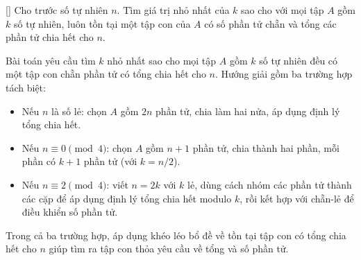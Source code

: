 \documentclass[../09-contruction-methods.tex]{subfiles}
\begin{document}
\begin{example*}\label{example:IRN-2015-TST-D2-P1}[\textbf{}]
	Cho trước số tự nhiên \( n \). Tìm giá trị nhỏ nhất của \( k \) sao cho với mọi tập \( A \) gồm \( k \) số tự nhiên,
	luôn tồn tại một tập con của \( A \) có số phần tử chẵn và tổng các phần tử chia hết cho \( n \).
\end{example*}

\begin{story*}
	Bài toán yêu cầu tìm \( k \) nhỏ nhất sao cho mọi tập \( A \) gồm \( k \) số tự nhiên đều có một tập con chẵn phần tử có tổng chia hết cho \( n \).  
	Hướng giải gồm ba trường hợp tách biệt:
	\begin{itemize}[topsep=0pt, partopsep=0pt, itemsep=0pt]
		\item Nếu \( n \) là số lẻ: chọn \( A \) gồm \( 2n \) phần tử, chia làm hai nửa, áp dụng định lý tổng chia hết.
		\item Nếu \( n \equiv 0 \pmod{4} \): chọn \( A \) gồm \( n + 1 \) phần tử, chia thành hai phần, mỗi phần có \( k + 1 \) phần tử (với \( k = n/2 \)).
		\item Nếu \( n \equiv 2 \pmod{4} \): viết \( n = 2k \) với \( k \) lẻ, dùng cách nhóm các phần tử thành các cặp để áp dụng định lý tổng chia hết modulo \( k \), rồi kết hợp với chẵn-lẻ để điều khiển số phần tử.
	\end{itemize}
	Trong cả ba trường hợp, áp dụng khéo léo bổ đề về tồn tại tập con có tổng chia hết cho \( n \) giúp tìm ra tập con thỏa yêu cầu về tổng và số phần tử.
\end{story*}

\bigbreak
\end{document}
